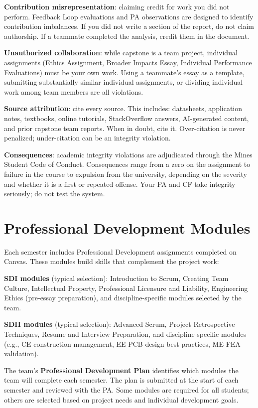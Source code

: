 \textbf{Contribution misrepresentation}: claiming credit for work you did not perform. Feedback Loop evaluations and PA observations are designed to identify contribution imbalances. If you did not write a section of the report, do not claim authorship. If a teammate completed the analysis, credit them in the document.

\textbf{Unauthorized collaboration}: while capstone is a team project, individual assignments (Ethics Assignment, Broader Impacts Essay, Individual Performance Evaluations) must be your own work. Using a teammate's essay as a template, submitting substantially similar individual assignments, or dividing individual work among team members are all violations.

\textbf{Source attribution}: cite every source. This includes: datasheets, application notes, textbooks, online tutorials, StackOverflow answers, AI-generated content, and prior capstone team reports. When in doubt, cite it. Over-citation is never penalized; under-citation can be an integrity violation.

\textbf{Consequences}: academic integrity violations are adjudicated through the Mines Student Code of Conduct. Consequences range from a zero on the assignment to failure in the course to expulsion from the university, depending on the severity and whether it is a first or repeated offense. Your PA and CF take integrity seriously; do not test the system.


\section{Professional Development Modules}
Each semester includes Professional Development assignments completed on Canvas. These modules build skills that complement the project work:

\textbf{SDI modules} (typical selection): Introduction to Scrum, Creating Team Culture, Intellectual Property, Professional Licensure and Liability, Engineering Ethics (pre-essay preparation), and discipline-specific modules selected by the team.

\textbf{SDII modules} (typical selection): Advanced Scrum, Project Retrospective Techniques, Resume and Interview Preparation, and discipline-specific modules (e.g., CE construction management, EE PCB design best practices, ME FEA validation).

The team's \textbf{Professional Development Plan} identifies which modules the team will complete each semester. The plan is submitted at the start of each semester and reviewed with the PA. Some modules are required for all students; others are selected based on project needs and individual development goals.

